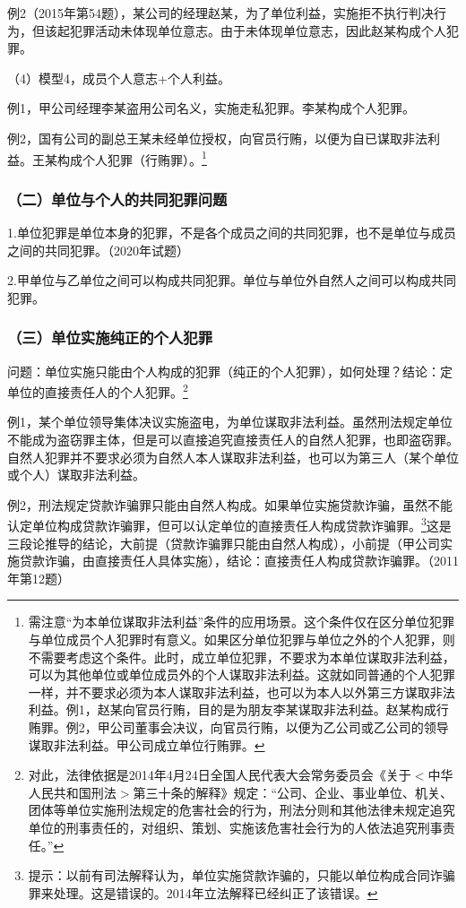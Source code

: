 例2（2015年第54题），某公司的经理赵某，为了单位利益，实施拒不执行判决行为，但该起犯罪活动未体现单位意志。由于未体现单位意志，因此赵某构成个人犯罪。

（4）模型4，成员个人意志+个人利益。

例1，甲公司经理李某盗用公司名义，实施走私犯罪。李某构成个人犯罪。

例2，国有公司的副总王某未经单位授权，向官员行贿，以便为自已谋取非法利益。王某构成个人犯罪（行贿罪）。\footnote{需注意“为本单位谋取非法利益”条件的应用场景。这个条件仅在区分单位犯罪与单位成员个人犯罪时有意义。如果区分单位犯罪与单位之外的个人犯罪，则不需要考虑这个条件。此时，成立单位犯罪，不要求为本单位谋取非法利益，可以为其他单位或单位成员外的个人谋取非法利益。这就如同普通的个人犯罪一样，并不要求必须为本人谋取非法利益，也可以为本人以外第三方谋取非法利益。例1，赵某向官员行贿，目的是为朋友李某谋取非法利益。赵某构成行贿罪。例2，甲公司董事会决议，向官员行贿，以便为乙公司或乙公司的领导谋取非法利益。甲公司成立单位行贿罪。}

\subsubsection*{（二）单位与个人的共同犯罪问题}

1.单位犯罪是单位本身的犯罪，不是各个成员之间的共同犯罪，也不是单位与成员之间的共同犯罪。（2020年试题）

2.甲单位与乙单位之间可以构成共同犯罪。单位与单位外自然人之间可以构成共同犯罪。

\subsubsection*{（三）单位实施纯正的个人犯罪}

问题：单位实施只能由个人构成的犯罪（纯正的个人犯罪），如何处理？结论：定单位的直接责任人的个人犯罪。\footnote{对此，法律依据是2014年4月24日全国人民代表大会常务委员会《关于\ensuremath{<}中华人民共和国刑法\ensuremath{>}第三十条的解释》规定：“公司、企业、事业单位、机关、团体等单位实施刑法规定的危害社会的行为，刑法分则和其他法律未规定追究单位的刑事责任的，对组织、策划、实施该危害社会行为的人依法追究刑事责任。”}

例1，某个单位领导集体决议实施盗电，为单位谋取非法利益。虽然刑法规定单位不能成为盗窃罪主体，但是可以直接追究直接责任人的自然人犯罪，也即盗窃罪。自然人犯罪并不要求必须为自然人本人谋取非法利益，也可以为第三人（某个单位或个人）谋取非法利益。

例2，刑法规定贷款诈骗罪只能由自然人构成。如果单位实施贷款诈骗，虽然不能认定单位构成贷款诈骗罪，但可以认定单位的直接责任人构成贷款诈骗罪。\footnote{提示：以前有司法解释认为，单位实施贷款诈骗的，只能以单位构成合同诈骗罪来处理。这是错误的。2014年立法解释已经纠正了该错误。}这是三段论推导的结论，大前提（贷款诈骗罪只能由自然人构成），小前提（甲公司实施贷款诈骗，由直接责任人具体实施），结论：直接责任人构成贷款诈骗罪。（2011年第12题）

